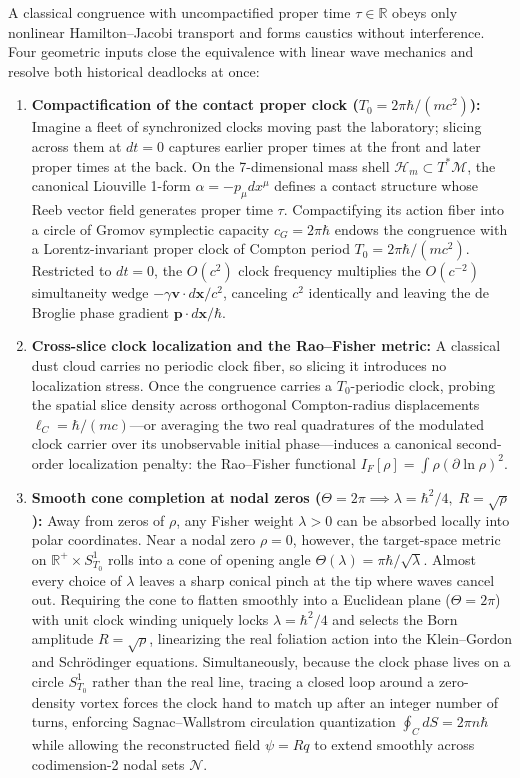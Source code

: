 \documentclass[11pt, a4paper]{article}
\theoremstyle{definition}
\begin{document}
A classical congruence with uncompactified proper time $\tau \in \mathbb{R}$ obeys only nonlinear Hamilton--Jacobi transport and forms caustics without interference. Four geometric inputs close the equivalence with linear wave mechanics and resolve both historical deadlocks at once:
\begin{enumerate}[label=(\Roman*)]
    \item \textbf{Compactification of the contact proper clock ($T_0 = 2\pi\hbar/(mc^2)$):} Imagine a fleet of synchronized clocks moving past the laboratory; slicing across them at $dt = 0$ captures earlier proper times at the front and later proper times at the back. On the 7-dimensional mass shell $\mathcal{H}_m \subset T^*\mathcal{M}$, the canonical Liouville 1-form $\alpha = -p_\mu dx^\mu$ defines a contact structure whose Reeb vector field generates proper time $\tau$. Compactifying its action fiber into a circle of Gromov symplectic capacity $c_G = 2\pi\hbar$ endows the congruence with a Lorentz-invariant proper clock of Compton period $T_0 = 2\pi\hbar/(mc^2)$. Restricted to $dt = 0$, the $O(c^2)$ clock frequency multiplies the $O(c^{-2})$ simultaneity wedge $-\gamma\mathbf{v}\cdot d\mathbf{x}/c^2$, canceling $c^2$ identically and leaving the de Broglie phase gradient $\mathbf{p}\cdot d\mathbf{x}/\hbar$.
    \item \textbf{Cross-slice clock localization and the Rao--Fisher metric:} A classical dust cloud carries no periodic clock fiber, so slicing it introduces no localization stress. Once the congruence carries a $T_0$-periodic clock, probing the spatial slice density across orthogonal Compton-radius displacements $\ell_C = \hbar/(mc)$---or averaging the two real quadratures of the modulated clock carrier over its unobservable initial phase---induces a canonical second-order localization penalty: the Rao--Fisher functional $I_F[\rho] = \int \rho(\partial\ln\rho)^2$.
    \item \textbf{Smooth cone completion at nodal zeros ($\Theta = 2\pi \implies \lambda = \hbar^2/4,\; R = \sqrt{\rho}$):} Away from zeros of $\rho$, any Fisher weight $\lambda > 0$ can be absorbed locally into polar coordinates. Near a nodal zero $\rho = 0$, however, the target-space metric on $\mathbb{R}^+ \times S^1_{T_0}$ rolls into a cone of opening angle $\Theta(\lambda) = \pi\hbar/\sqrt{\lambda}$. Almost every choice of $\lambda$ leaves a sharp conical pinch at the tip where waves cancel out. Requiring the cone to flatten smoothly into a Euclidean plane ($\Theta = 2\pi$) with unit clock winding uniquely locks $\lambda = \hbar^2/4$ and selects the Born amplitude $R = \sqrt{\rho}$, linearizing the real foliation action into the Klein--Gordon and Schr\"{o}dinger equations. Simultaneously, because the clock phase lives on a circle $S^1_{T_0}$ rather than the real line, tracing a closed loop around a zero-density vortex forces the clock hand to match up after an integer number of turns, enforcing Sagnac--Wallstrom circulation quantization $\oint_C dS = 2\pi n\hbar$ while allowing the reconstructed field $\psi = Rq$ to extend smoothly across codimension-2 nodal sets $\mathcal{N}$.

\end{enumerate}
\end{document}
